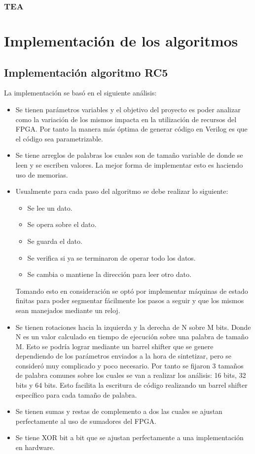 \subsection{TEA}




\chapter{Implementación de los algoritmos}

\section{Implementación algoritmo RC5}
La implementación se basó en el siguiente análisis:
\begin{itemize}
\item Se tienen parámetros variables y el objetivo del proyecto es poder analizar como la variación de los mismos impacta en la utilización de recursos del FPGA. Por tanto la manera más óptima de generar código en Verilog es que el código sea parametrizable.

\item Se tiene arreglos de palabras los cuales son de tamaño variable de donde se leen y se escriben valores. La mejor forma de implementar esto es haciendo uso de memorias.

\item Usualmente para cada paso del algoritmo se debe realizar lo siguiente:
\begin{itemize}
\item Se lee un dato.
\item Se opera sobre el dato.
\item Se guarda el dato.
\item Se verifica si ya se terminaron de operar todo los datos.
\item Se cambia o mantiene la dirección para leer otro dato.
\end{itemize}
Tomando esto en consideración se optó por implementar máquinas de estado finitas para poder segmentar fácilmente los pasos a seguir y que los mismos sean manejados mediante un reloj.

\item Se tienen rotaciones hacia la izquierda y la derecha de N sobre M bits. Donde N es un valor calculado en tiempo de ejecución sobre una palabra de tamaño M. Esto se podría lograr mediante un barrel shifter que se genere dependiendo de los parámetros enviados a la hora de sintetizar, pero se consideró muy complicado y poco necesario. Por tanto se fijaron 3 tamaños de palabra comunes sobre los cuales se van a realizar los análisis: 16 bits, 32 bits y 64 bits. Esto facilita la escritura de código realizando un barrel shifter específico para cada tamaño de palabra. 

\item Se tienen sumas y restas de complemento a dos las cuales se ajustan perfectamente al uso de sumadores del FPGA.

\item Se tiene XOR bit a bit que se ajustan perfectamente a una implementación en hardware.
\end{itemize}

